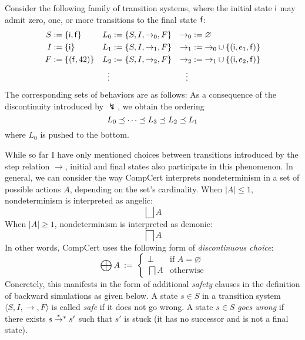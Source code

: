 \documentclass[sigplan,10pt,authordraft]{acmart}
\begin{document}
\begin{example} %
Consider the following family of transition systems,
where the initial state $ \mathsf{i} $ may admit zero, one, or more
transitions to the final state $ \mathsf{f} $:
\begin{align*}
  S &:= \{  \mathsf{i} ,  \mathsf{f}  \} &
  L_0 &:= \{ S, I, {\rightarrow_0}, F \} &
  {\rightarrow_0} &:= \varnothing \\
  I &:= \{  \mathsf{i}  \} &
  L_1 &:= \{ S, I, {\rightarrow_1}, F \} &
  {\rightarrow_1} &:= {\rightarrow_0} \cup
    \{ ( \mathsf{i} , e_1,  \mathsf{f} ) \} \\
  F &:= \{ ( \mathsf{f} , 42) \} &
  L_2 &:= \{ S, I, {\rightarrow_2}, F \} &
  {\rightarrow_2} &:= {\rightarrow_1} \cup
    \{ ( \mathsf{i} , e_2,  \mathsf{f} ) \} \\
  & & \vdots \: & & \vdots \:\:
\end{align*}
The corresponding sets of behaviors are as follows:
As a consequence of the discontinuity introduced by $\lightning$,
we obtain the ordering
\[
  L_0 \preceq \cdots \preceq L_3 \preceq L_2 \preceq L_1
\]
where $L_0$ is pushed to the bottom.
\end{example}

While so far I have only mentioned
choices between transitions
introduced by the step relation $\rightarrow$,
initial and final states also participate in this phenomenon.
In general,
we can consider the way CompCert interprets nondeterminism
in a set of possible actions $A$,
depending on the set's cardinality.
When $|A| \le 1$, nondeterminism is interpreted as angelic:
\[
  \bigsqcup A
\]
When $|A| \ge 1$, nondeterminism is interpreted as demonic:
\[
  \bigsqcap A
\]
In other words, CompCert uses the following form of
\emph{discontinuous choice}:
\[
  \bigoplus A \: := \:
  \begin{cases}
    \bot & \mbox{if } A = \varnothing \\
    \bigsqcap A & \mbox{otherwise}
  \end{cases}
\]
Concretely, this manifests in the form of additional
\emph{safety} clauses
in the definition of backward simulations
as given below.
A state $s \in S$
in a transition system $\langle S, I, {\rightarrow}, F \rangle$
is called \emph{safe}
if it does not go wrong.
A state $s \in S$
\emph{goes wrong} if there exists
$s \mathrel{\smash{\stackrel{\epsilon}{\rightarrow}}^*} s'$
such that $s'$ is stuck
(it has no successor and is not a final state).
\end{document}
